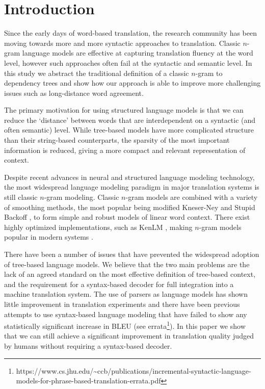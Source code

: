 \documentclass[english]{jnlp_1.4}
\begin{document}
\maketitle

\section{Introduction}
Since the early days of word-based translation, the research community
has been moving towards more and more syntactic approaches to translation.
Classic $n$-gram language models are effective
at capturing translation fluency at the word level, however such approaches
often fail at the syntactic and semantic level. In this study we abstract
the traditional definition of a classic $n$-gram to dependency trees and show how
our approach is able to improve more challenging issues such as long-distance
word agreement.

The primary motivation for using structured language models is that we
can reduce the `distance' between words that are interdependent on a syntactic
(and often semantic) level. While tree-based models have more complicated
structure than their string-based counterparts, the sparsity of the most important
information is reduced, giving a more compact and relevant representation
of context.

Despite recent advances in neural and structured language modeling technology,
the most widespread language modeling paradigm in major translation systems
is still classic $n$-gram modeling. Classic $n$-gram
models are combined with a variety of smoothing methods,
the most popular being modified Kneser-Ney \cite{Chen96} and Stupid Backoff
\cite{Brants07}, to form simple and robust models of linear word context.
There exist highly optimized implementations, such as KenLM \cite{KenLM},
making $n$-gram models popular in modern systems \cite{Moses,Travatar,KyotoEBMT}.

There have been a number of issues that have prevented the widespread adoption
of tree-based language models.
We believe that the two main problems are the lack of an agreed standard on the
most effective definition of tree-based context, and the requirement for a
syntax-based decoder for full integration into a machine translation system.
The use of parsers as language models has shown little improvement
in translation experiments \cite{Och04,Post08} and there have been previous
attempts to use syntax-based language modeling that have failed to show any
statistically significant increase in BLEU \cite{Schwartz11}
(see errata\footnote{https://www.cs.jhu.edu/{\textasciitilde}ccb/publications/incremental-syntactic-language-models-for-phrase-based-translation-errata.pdf}).
In this paper we show that we can still achieve a significant improvement in
translation quality judged by humans without requiring a syntax-based decoder.
\end{document}
